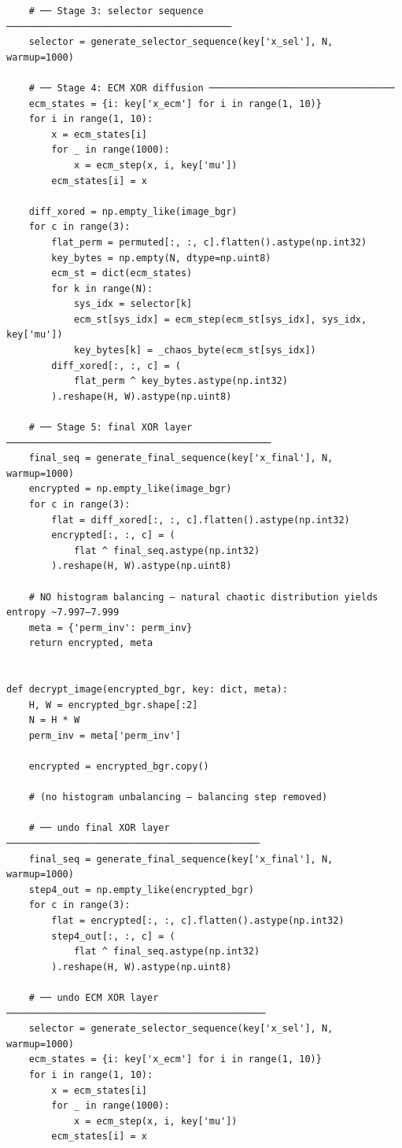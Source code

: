 \begin{verbatim}
    # ── Stage 3: selector sequence ────────────────────────────────────────
    selector = generate_selector_sequence(key['x_sel'], N, warmup=1000)

    # ── Stage 4: ECM XOR diffusion ─────────────────────────────────
    ecm_states = {i: key['x_ecm'] for i in range(1, 10)}
    for i in range(1, 10):
        x = ecm_states[i]
        for _ in range(1000):
            x = ecm_step(x, i, key['mu'])
        ecm_states[i] = x

    diff_xored = np.empty_like(image_bgr)
    for c in range(3):
        flat_perm = permuted[:, :, c].flatten().astype(np.int32)
        key_bytes = np.empty(N, dtype=np.uint8)
        ecm_st = dict(ecm_states)
        for k in range(N):
            sys_idx = selector[k]
            ecm_st[sys_idx] = ecm_step(ecm_st[sys_idx], sys_idx, key['mu'])
            key_bytes[k] = _chaos_byte(ecm_st[sys_idx])
        diff_xored[:, :, c] = (
            flat_perm ^ key_bytes.astype(np.int32)
        ).reshape(H, W).astype(np.uint8)

    # ── Stage 5: final XOR layer ───────────────────────────────────────────────
    final_seq = generate_final_sequence(key['x_final'], N, warmup=1000)
    encrypted = np.empty_like(image_bgr)
    for c in range(3):
        flat = diff_xored[:, :, c].flatten().astype(np.int32)
        encrypted[:, :, c] = (
            flat ^ final_seq.astype(np.int32)
        ).reshape(H, W).astype(np.uint8)

    # NO histogram balancing — natural chaotic distribution yields entropy ~7.997–7.999
    meta = {'perm_inv': perm_inv}
    return encrypted, meta


def decrypt_image(encrypted_bgr, key: dict, meta):
    H, W = encrypted_bgr.shape[:2]
    N = H * W
    perm_inv = meta['perm_inv']

    encrypted = encrypted_bgr.copy()

    # (no histogram unbalancing — balancing step removed)

    # ── undo final XOR layer ─────────────────────────────────────────────
    final_seq = generate_final_sequence(key['x_final'], N, warmup=1000)
    step4_out = np.empty_like(encrypted_bgr)
    for c in range(3):
        flat = encrypted[:, :, c].flatten().astype(np.int32)
        step4_out[:, :, c] = (
            flat ^ final_seq.astype(np.int32)
        ).reshape(H, W).astype(np.uint8)

    # ── undo ECM XOR layer ──────────────────────────────────────────────
    selector = generate_selector_sequence(key['x_sel'], N, warmup=1000)
    ecm_states = {i: key['x_ecm'] for i in range(1, 10)}
    for i in range(1, 10):
        x = ecm_states[i]
        for _ in range(1000):
            x = ecm_step(x, i, key['mu'])
        ecm_states[i] = x


\end{verbatim}
